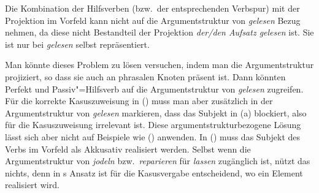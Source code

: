 Die Kombination der Hilfsverben (bzw.\ der entsprechenden Verbspur)
mit der Projektion im Vorfeld kann nicht auf die Argumentstruktur von
\emph{gelesen} Bezug nehmen, da diese nicht Bestandteil der Projektion
\emph{der/den Aufsatz gelesen} ist. Sie ist nur bei \emph{gelesen} selbst repräsentiert.

Man könnte dieses Problem zu lösen versuchen, indem man die Argumentstruktur
projiziert, so dass sie auch an phrasalen Knoten präsent ist. 
Dann könnten Perfekt
und Passiv"=Hilfsverb auf die Argumentstruktur von \emph{gelesen} zugreifen.
Für die korrekte Kasuszuweisung in () muss man aber zusätzlich
in der Argumentstruktur von \emph{gelesen} markieren, dass das Subjekt
in (a) blockiert, also für die Kasuszuweisung irrelevant ist.
Diese argumentstrukturbezogene Lösung lässt sich aber nicht auf Beispiele
wie () anwenden. In () muss das Subjekt des Verbs im Vorfeld
als Akkusativ realisiert werden.
\eal
\label{bsp-den-saenger-jodeln}
\zl
Selbst wenn die Argumentstruktur von \emph{jodeln} bzw.\ \emph{reparieren}
für \emph{lassen} zugänglich ist, nützt das nichts, denn in \prz{}s
Ansatz ist für die Kasusvergabe entscheidend, wo ein Element realisiert wird.

